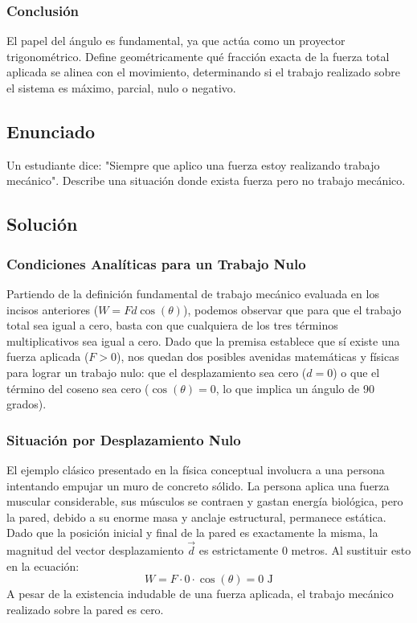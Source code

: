 \documentclass[a4paper,12pt]{article}
\begin{document}
\subsubsection*{Conclusión}
El papel del ángulo es fundamental, ya que actúa como un proyector trigonométrico. Define geométricamente qué fracción exacta de la fuerza total aplicada se alinea con el movimiento, determinando si el trabajo realizado sobre el sistema es máximo, parcial, nulo o negativo.

\newpage
\subsection*{Enunciado}
Un estudiante dice: "Siempre que aplico una fuerza estoy realizando trabajo mecánico". 
Describe una situación donde exista fuerza pero no trabajo mecánico.

\subsection*{Solución}

\subsubsection*{Condiciones Analíticas para un Trabajo Nulo}
Partiendo de la definición fundamental de trabajo mecánico evaluada en los incisos anteriores ($W = F d \cos(\theta)$), podemos observar que para que el trabajo total sea igual a cero, basta con que cualquiera de los tres términos multiplicativos sea igual a cero. Dado que la premisa establece que sí existe una fuerza aplicada ($F > 0$), nos quedan dos posibles avenidas matemáticas y físicas para lograr un trabajo nulo: que el desplazamiento sea cero ($d = 0$) o que el término del coseno sea cero ($\cos(\theta) = 0$, lo que implica un ángulo de 90 grados). 

\subsubsection*{Situación por Desplazamiento Nulo}
El ejemplo clásico presentado en la física conceptual involucra a una persona intentando empujar un muro de concreto sólido. La persona aplica una fuerza muscular considerable, sus músculos se contraen y gastan energía biológica, pero la pared, debido a su enorme masa y anclaje estructural, permanece estática. Dado que la posición inicial y final de la pared es exactamente la misma, la magnitud del vector desplazamiento $\vec{d}$ es estrictamente $0$ metros. Al sustituir esto en la ecuación:
$$W = F \cdot 0 \cdot \cos(\theta) = 0 \text{ J}$$
A pesar de la existencia indudable de una fuerza aplicada, el trabajo mecánico realizado sobre la pared es cero.
\end{document}
